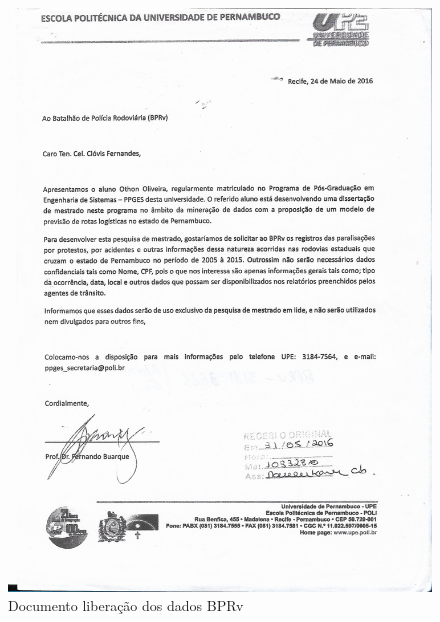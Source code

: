 \begin{figure}[ht!]
	\centering
	\caption{Documento liberação dos dados BPRv}
	\includegraphics[scale=0.35]{Figuras/Anexos/A1-BPRvpg001.pdf}
\end{figure}

